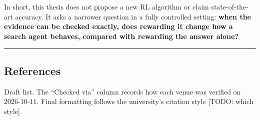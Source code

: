 In short, this thesis does not propose a new RL algorithm or claim
state-of-the-art accuracy. It asks a narrower question in a fully
controlled setting: \textbf{when the evidence can be checked exactly,
does rewarding it change how a search agent behaves, compared with
rewarding the answer alone?}

\begin{center}\rule{0.5\linewidth}{0.5pt}\end{center}

\subsection{References}\label{references}

Draft list. The ``Checked via'' column records how each venue was
verified on 2026-10-11. Final formatting follows the university's
citation style {[}TODO: which style{]}.

